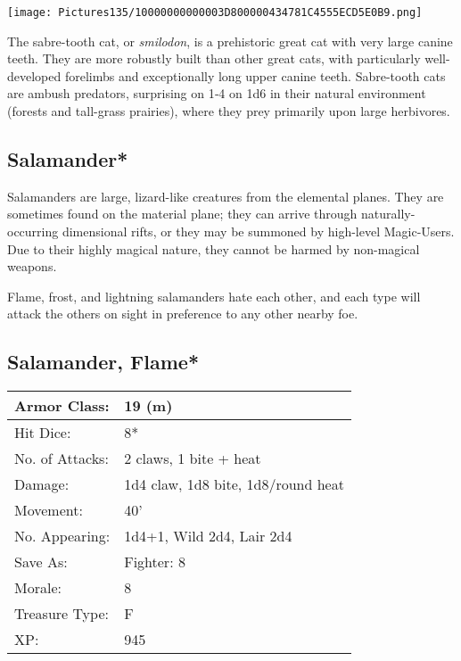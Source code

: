 \documentclass[a4paper,twoside,openany,10pt]{book}
\begin{document}
\begin{multicols}{2}
\begin{center} \texttt{[image: Pictures135/10000000000003D800000434781C4555ECD5E0B9.png]} \end{center}

The sabre-tooth cat, or \emph{smilodon}, is a prehistoric great cat with very large canine teeth. They are more robustly built than other great cats, with particularly well-developed forelimbs and exceptionally long upper canine teeth. Sabre-tooth cats are ambush predators, surprising on 1‑4 on 1d6 in their natural environment (forests and tall-grass prairies), where they prey primarily upon large herbivores.


\subsection*{Salamander*}\label{salamander}

Salamanders are large, lizard-like creatures from the elemental planes. They are sometimes found on the material plane; they can arrive through naturally-occurring dimensional rifts, or they may be summoned by high-level Magic-Users. Due to their highly magical nature, they cannot be harmed by non-magical weapons.

Flame, frost, and lightning salamanders hate each other, and each type will attack the others on sight in preference to any other nearby foe.

\subsection*{Salamander, Flame*}\label{salamander-flame}

\begin{tabularx}{0.50\textwidth}{@{}lX@{}}
Armor Class: & 19 (m) \\\hline
Hit Dice: & 8* \\\hline
No. of Attacks: & 2 claws, 1 bite + heat \\\hline
Damage: & 1d4 claw, 1d8 bite, 1d8/round heat \\\hline
Movement: & 40' \\\hline
No. Appearing: & 1d4+1, Wild 2d4, Lair 2d4 \\\hline
Save As: & Fighter: 8 \\\hline
Morale: & 8 \\\hline
Treasure Type: & F \\\hline
XP: & 945 \\\hline
\end{tabularx}\medskip



\end{multicols}
\end{document}
